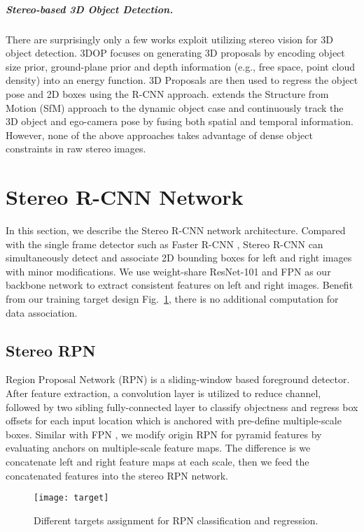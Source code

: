 \documentclass[10pt,twocolumn,letterpaper]{article}
\begin{document}
\vspace{-0.3cm}
	{\setlength{\parindent}{0cm}
		\subparagraph*{Stereo-based 3D Object Detection.}There are surprisingly only a few works exploit utilizing stereo vision for 3D object detection. 3DOP \cite{3dopJournal} focuses on generating 3D proposals by encoding object size prior, ground-plane prior and depth information (e.g., free space, point cloud density) into an energy function. 3D Proposals are then used to regress the object pose and 2D boxes using the R-CNN approach. \cite{li2018semantic} extends the Structure from Motion (SfM) approach to the dynamic object case and continuously track the 3D object and ego-camera pose by fusing both spatial and temporal information. However, none of the above approaches takes advantage of dense object constraints in raw stereo images.
	}
	
	\section{Stereo R-CNN Network}
	\label{sec:rcnn}
	In this section, we describe the Stereo R-CNN network architecture. Compared with the single frame detector such as Faster R-CNN \cite{ren2015faster}, Stereo R-CNN can simultaneously detect and associate 2D bounding boxes for left and right images with minor modifications. We use weight-share ResNet-101 \cite{he2016deep} and FPN \cite{lin2017feature} as our backbone network to extract consistent features on left and right images. Benefit from our training target design Fig.~\ref{fig:target}, there is no additional computation for data association.
	
	\subsection{Stereo RPN}
	\label{sec:rpn}
	Region Proposal Network (RPN) \cite{ren2015faster} is a sliding-window based foreground detector. After feature extraction, a  convolution layer is utilized to reduce channel, followed by two sibling fully-connected
	layer to classify objectness and regress box offsets for each input location which is anchored with pre-define multiple-scale boxes. Similar with FPN \cite{lin2017feature}, we modify origin RPN for pyramid features by evaluating  anchors on multiple-scale feature maps. The difference is we concatenate left and right feature maps at each scale, then we feed the concatenated features into the stereo RPN network. 
	\begin{figure}
	\setlength{\belowcaptionskip}{-0.3cm}
		\begin{center}
			\texttt{[image: target]}
		\end{center}
		\caption{Different targets assignment for RPN classification and regression.}
		\label{fig:target}
	\end{figure}
	
\end{document}
